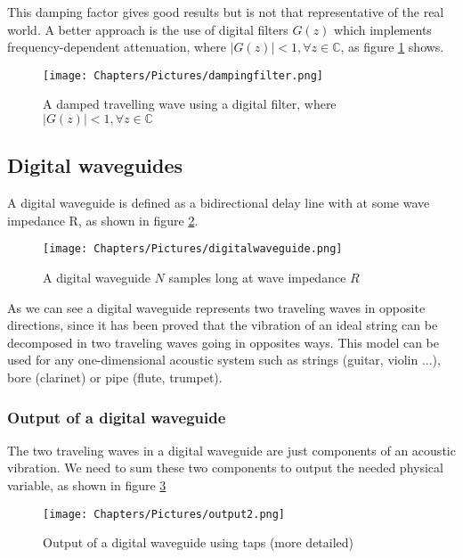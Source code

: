 This damping factor gives good results but is not that representative of the real world. A better approach is the use of digital filters $G(z)$ which implements frequency-dependent attenuation, where $|G(z)| < 1, \forall z \in \mathbb{C}$, as figure \ref{fig:dampingfilter} shows.

\begin{figure}[h]
    \centering
    \texttt{[image: Chapters/Pictures/dampingfilter.png]}
    \caption{A damped travelling wave using a digital filter, where $|G(z)| < 1, \forall z \in \mathbb{C}$}
    \label{fig:dampingfilter}
\end{figure}

\subsection{Digital waveguides}

A digital waveguide is defined as a bidirectional delay line with at some wave impedance R, as shown in figure \ref{fig:digitalwaveguide}.

\begin{figure}[h]
    \centering
    \texttt{[image: Chapters/Pictures/digitalwaveguide.png]}
    \caption{A digital waveguide $N$ samples long at wave impedance $R$}
    \label{fig:digitalwaveguide}
\end{figure}

As we can see a digital waveguide represents two traveling waves in opposite directions, since it has been proved that the vibration of an ideal string can be decomposed in two traveling waves going in opposites ways.
This model can be used for any one-dimensional acoustic system such as strings (guitar, violin ...), bore (clarinet) or pipe (flute, trumpet).


\subsubsection*{Output of a digital waveguide}
The two traveling waves in a digital waveguide are just components of an acoustic vibration. We need to sum these two components to output the needed physical variable, as shown in figure \ref{fig:output2}


\begin{figure}[h]
    \centering
    \texttt{[image: Chapters/Pictures/output2.png]}
    \caption{Output of a digital waveguide using taps (more detailed)}
    \label{fig:output2}
\end{figure}


